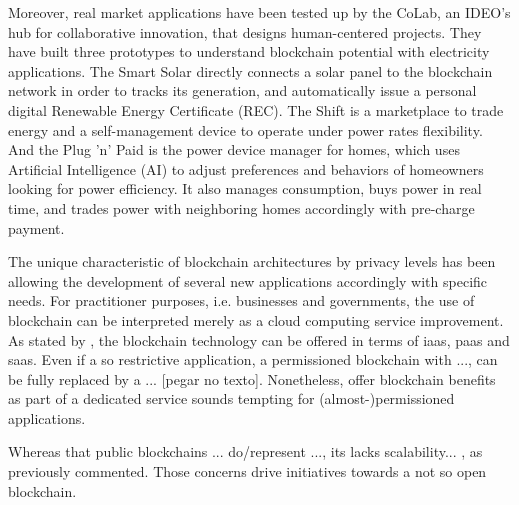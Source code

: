 Moreover, real market applications have been tested up by the CoLab,
an IDEO's hub for collaborative innovation, that designs human-centered projects.
They have built three prototypes to understand blockchain potential with electricity applications.
The Smart Solar %
directly connects a solar panel to the blockchain network in order to tracks its generation, 
and automatically issue a personal digital Renewable Energy Certificate (REC).
The Shift %
is a marketplace to trade energy and a self-management device to operate under power rates flexibility.
And the Plug 'n' Paid %
is the power device manager for homes, which uses Artificial Intelligence (AI) to adjust preferences and behaviors of homeowners looking for power efficiency.
It also manages consumption, buys power in real time, and trades power with neighboring homes accordingly with pre-charge payment.













The unique characteristic of blockchain architectures by privacy levels has been allowing the development of several new applications accordingly with specific needs.
For practitioner purposes, i.e. businesses and governments, the use of blockchain can be interpreted merely as a cloud computing service improvement.
As stated by , the blockchain technology can be offered in terms of \acrfull{iaas}, \acrfull{paas} and \acrfull{saas}.
Even if a so restrictive application, a permissioned blockchain with ..., can be fully replaced by a ... [pegar no texto].
Nonetheless, offer blockchain benefits as part of a dedicated service sounds tempting for (almost-)permissioned applications.


Whereas that public blockchains ... do/represent ..., its lacks scalability... , as previously commented.
Those concerns drive initiatives towards a not so open blockchain.

